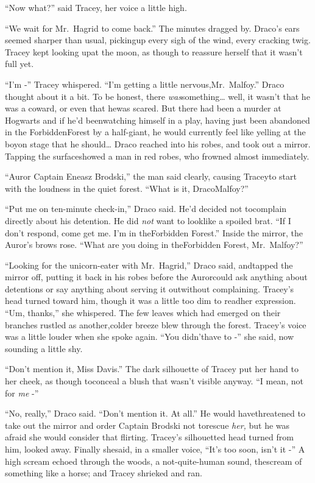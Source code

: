 ``Now what?'' said Tracey, her voice a little high.

``We wait for Mr.~Hagrid to come back.''
The minutes dragged by. Draco's ears seemed sharper than usual, pickingup every sigh of the wind, every cracking twig. Tracey kept looking upat the moon, as though to reassure herself that it wasn't full yet.

``I'm -'' Tracey whispered. ``I'm getting a little nervous,Mr.~Malfoy.''
Draco thought about it a bit. To be honest, there \emph{was}something\ldots{} well, it wasn't that he was a coward, or even that hewas scared. But there had been a murder at Hogwarts and if he'd beenwatching himself in a play, having just been abandoned in the ForbiddenForest by a half-giant, he would currently feel like yelling at the boyon stage that he should\ldots{}
Draco reached into his robes, and took out a mirror. Tapping the surfaceshowed a man in red robes, who frowned almost immediately.

``Auror Captain Eneasz Brodski,'' the man said clearly, causing Traceyto start with the loudness in the quiet forest. ``What is it, DracoMalfoy?''

``Put me on ten-minute check-in,'' Draco said. He'd decided not tocomplain directly about his detention. He did \emph{not} want to looklike a spoiled brat. ``If I don't respond, come get me. I'm in theForbidden Forest.''
Inside the mirror, the Auror's brows rose. ``What are you doing in theForbidden Forest, Mr.~Malfoy?''

``Looking for the unicorn-eater with Mr.~Hagrid,'' Draco said, andtapped the mirror off, putting it back in his robes before the Aurorcould ask anything about detentions or say anything about serving it outwithout complaining.
Tracey's head turned toward him, though it was a little too dim to readher expression. ``Um, thanks,'' she whispered.
The few leaves which had emerged on their branches rustled as another,colder breeze blew through the forest.
Tracey's voice was a little louder when she spoke again. ``You didn'thave to -'' she said, now sounding a little shy.

``Don't mention it, Miss Davis.''
The dark silhouette of Tracey put her hand to her cheek, as though toconceal a blush that wasn't visible anyway. ``I mean, not for \emph{me}
-''

``No, really,'' Draco said. ``Don't mention it. At all.'' He would havethreatened to take out the mirror and order Captain Brodski not torescue \emph{her,} but he was afraid she would consider that flirting.
Tracey's silhouetted head turned from him, looked away. Finally shesaid, in a smaller voice, ``It's too soon, isn't it -''
A high scream echoed through the woods, a not-quite-human sound, thescream of something like a horse; and Tracey shrieked and ran.

